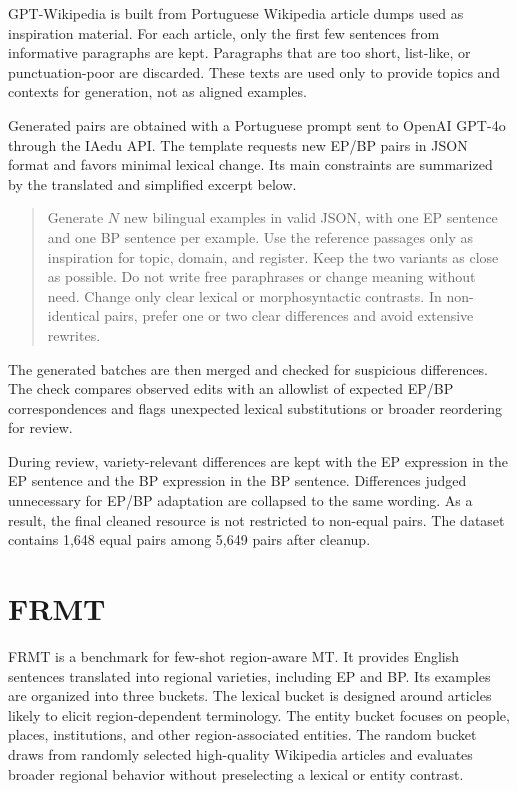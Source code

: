 GPT-Wikipedia is built from Portuguese Wikipedia article dumps used as
inspiration material. For each article, only the first few sentences from
informative paragraphs are kept. Paragraphs that are too short, list-like, or
punctuation-poor are discarded. These texts are used only to provide topics and
contexts for generation, not as aligned examples.

Generated pairs are obtained with a Portuguese prompt sent to OpenAI GPT-4o
through the IAedu API. The
template requests new EP/BP pairs in JSON format and favors minimal lexical
change. Its main constraints are summarized by the translated and simplified
excerpt below.

\begin{quote}
\small
Generate \(N\) new bilingual examples in valid JSON, with one
EP sentence and one BP sentence per example. Use the
reference passages only as inspiration for topic, domain, and register. Keep
the two variants as close as possible. Do not write free paraphrases or change
meaning without need. Change only clear lexical or morphosyntactic contrasts.
In non-identical pairs, prefer one or two clear differences and avoid extensive
rewrites.
\end{quote}

The generated batches are then merged and checked for suspicious differences.
The check compares observed edits with an allowlist of expected EP/BP
correspondences and flags unexpected lexical substitutions or broader reordering
for review.

{
During review, variety-relevant differences are kept with the EP expression in
the EP sentence and the BP expression in the BP sentence. Differences judged unnecessary
for EP/BP adaptation are collapsed to the same wording. As a result, the final
cleaned resource is not restricted to non-equal pairs. The dataset contains
1,648 equal pairs among 5,649 pairs after cleanup.\par}

\section{FRMT}
\label{sec:data-frmt}

{
FRMT \citep{riley2023frmtbenchmarkfewshotregionaware} is a benchmark for
few-shot region-aware MT. It provides English sentences translated into
regional varieties, including EP and BP. Its examples are organized into three
buckets. The lexical bucket is designed around
articles likely to elicit region-dependent terminology. The entity
bucket focuses on people, places, institutions, and other region-associated
entities. The random bucket draws from randomly selected high-quality
Wikipedia articles and evaluates broader regional behavior without
preselecting a lexical or entity contrast.\par}

